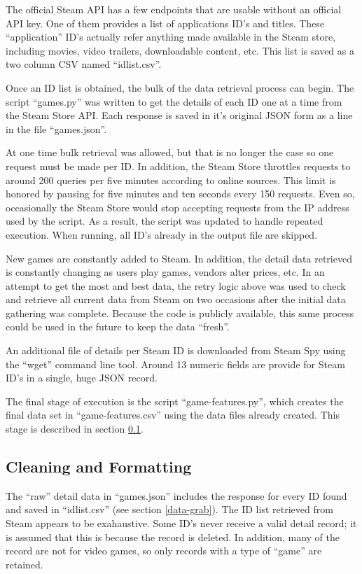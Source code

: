 \documentclass[letterpaper,10pt,twocolumn]{article}
\begin{document}
The official Steam API has a few endpoints that are usable without an official
API key. One of them provides a list of applications ID's and titles. These
``application'' ID's actually refer anything made available in the Steam
store, including movies, video trailers, downloadable content, etc. This list
is saved as a two column CSV named ``idlist.csv''.

Once an ID list is obtained, the bulk of the data retrieval process can begin.
The script ``games.py'' was written to get the details of each ID one at a
time from the Steam Store API. Each response is saved in it's original JSON
form as a line in the file ``games.json''.

At one time bulk retrieval was allowed, but that is no longer the case so one
request must be made per ID. In addition, the Steam Store throttles requests
to around 200 queries per five minutes according to online sources. This limit
is honored by pausing for five minutes and ten seconds every 150 requests.
Even so, occasionally the Steam Store would stop accepting requests from the
IP address used by the script. As a result, the script was updated to handle
repeated execution. When running, all ID's already in the output file are
skipped.

New games are constantly added to Steam. In addition, the detail data
retrieved is constantly changing as users play games, vendors alter prices,
etc. In an attempt to get the most and best data, the retry logic above was
used to check and retrieve all current data from Steam on two occasions after
the initial data gathering was complete. Because the code is publicly
available, this same process could be used in the future to keep the data
``fresh''.

An additional file of details per Steam ID is downloaded from Steam Spy using
the ``wget'' command line tool. Around 13 numeric fields are provide for Steam
ID's in a single, huge JSON record.

The final stage of execution is the script ``game-features.py'', which creates
the final data set in ``game-features.csv'' using the data files already
created. This stage is described in section \ref{data-clean}.

\subsection{Cleaning and Formatting}

\label{data-clean}

The ``raw'' detail data in ``games.json'' includes the response for every ID
found and saved in ``idlist.csv'' (see section \ref{data-grab}). The ID list
retrieved from Steam appears to be exahaustive. Some ID's never receive a
valid detail record; it is assumed that this is because the record is deleted.
In addition, many of the record are not for video games, so only records with
a type of ``game'' are retained.
\end{document}
